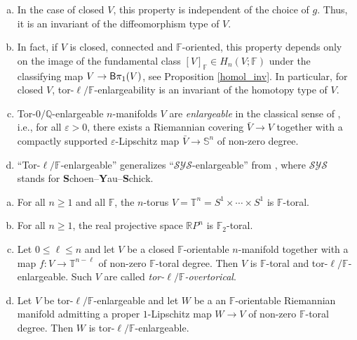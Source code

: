 \documentclass[10pt,a4paper]{amsart}
\numberwithin{equation}{section}
\newcommand{\F}{\mathbb{F}}
\newcommand{\SSS}{\mathbb{S}}
\newcommand{\TTT}{\mathbb{T}}
\newcommand{\eps}{\varepsilon}
\begin{document}
\begin{Remark}\quad
\begin{enumerate}[(a)]\itemsep=0pt
\item In the case of closed $V$, this property is independent of the choice of $g$.
Thus, it is an invariant of the diffeomorphism type of $V$.
\item In fact, if $V$ is closed, connected and $\F$-oriented, this property depends only on the image of the fundamental class $[V]_\F \in H_n(V; \F)$ under the classifying map $V \to {\sf B}\pi_1(V)$, see Proposition \ref{homol_inv}.
In particular, for closed $V$, tor-$\ell/\F$-enlargeability is an invariant of the homotopy type of $V$.
\item Tor-$0/ \mathbb{Q}$-enlargeable $n$-manifolds $V$ are {\em enlargeable} in the classical sense of \cite[Section 5]{G-L1983}, i.e., for all $\eps > 0$, there exists a Riemannian covering $\bar V \to V$ together with a compactly supported $\eps$-Lipschitz map $\bar V \to \SSS^n$ of non-zero degree.
\item ``Tor-$\ell/\F$-enlargeable'' generalizes ``$\mathcal{SYS}$-enlargeable'' from \cite{Gr2018}, where $\mathcal{SYS}$ stands for \textbf Schoen--\textbf Yau--\textbf Schick.
\end{enumerate}
\end{Remark}

\begin{Example} \label{ex:toral}\quad
\begin{enumerate}[(a)]\itemsep=0pt
\item \label{eins} For all $n \geq 1$ and all $\F$, the $n$-torus $V = \TTT^n = S^1 \times \cdots \times S^1$ is $\F$-toral.
\item \label{projspace} For all $n \geq 1$, the real projective space $\mathbb{R} P^n$ is $\F_2$-toral.
\item \label{ex:overtorical} Let $0 \leq \ell \leq n$ and let $V$ be a closed $\F$-orientable $n$-manifold together with a map $f \colon V \to {\TTT}^{n-\ell}$ of non-zero $\F$-toral degree.
Then $V$ is $\F$-toral and tor-$\ell/\F$-enlargeable.
Such $V$ are called {\em tor-$\ell/\F$-overtorical}.
\item Let $V$ be tor-$\ell / \F$-enlargeable and let $W$ be a an $\F$-orientable Riemannian manifold admitting a proper $1$-Lipschitz map $W \to V$ of non-zero $\F$-toral degree.
Then $W$ is tor-$\ell/\F$-enlargeable.
\end{enumerate}
\end{Example}
\end{document}
